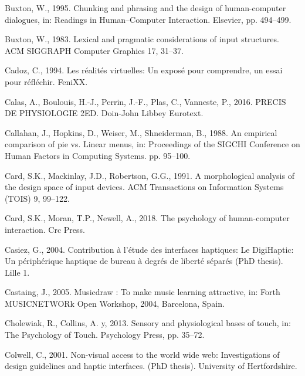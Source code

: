 \documentclass[
]{book}
\newlength{\cslhangindent}
\newlength{\cslentryspacingunit} %
\newenvironment{CSLReferences}[2] %
 {%
  \setlength{\parindent}{0pt}
  \ifodd #1
  \let\oldpar\par
  \def\par{\hangindent=\cslhangindent\oldpar}
  \fi
  \setlength{\parskip}{#2\cslentryspacingunit}
 }%
 {}
\begin{document}
\begin{CSLReferences}{1}{0}
\leavevmode{}%
Buxton, W., 1995. Chunking and phrasing and the design of human-computer dialogues, in: Readings in Human--Computer Interaction. Elsevier, pp. 494--499.

\leavevmode{}%
Buxton, W., 1983. Lexical and pragmatic considerations of input structures. ACM SIGGRAPH Computer Graphics 17, 31--37.

\leavevmode{}%
Cadoz, C., 1994. Les r{é}alit{é}s virtuelles: Un expos{é} pour comprendre, un essai pour r{é}fl{é}chir. FeniXX.

\leavevmode{}%
Calas, A., Boulouis, H.-J., Perrin, J.-F., Plas, C., Vanneste, P., 2016. PRECIS DE PHYSIOLOGIE 2ED. Doin-John Libbey Eurotext.

\leavevmode{}%
Callahan, J., Hopkins, D., Weiser, M., Shneiderman, B., 1988. An empirical comparison of pie vs. Linear menus, in: Proceedings of the SIGCHI Conference on Human Factors in Computing Systems. pp. 95--100.

\leavevmode{}%
Card, S.K., Mackinlay, J.D., Robertson, G.G., 1991. A morphological analysis of the design space of input devices. ACM Transactions on Information Systems (TOIS) 9, 99--122.

\leavevmode{}%
Card, S.K., Moran, T.P., Newell, A., 2018. The psychology of human-computer interaction. Crc Press.

\leavevmode{}%
Casiez, G., 2004. Contribution {à} l'{é}tude des interfaces haptiques: Le DigiHaptic: Un p{é}riph{é}rique haptique de bureau {à} degr{é}s de libert{é} s{é}par{é}s (PhD thesis). Lille 1.

\leavevmode{}%
Castaing, J., 2005. Musicdraw : To make music learning attractive, in: Forth MUSICNETWORk Open Workshop, 2004, Barcelona, Spain.

\leavevmode{}%
Cholewiak, R., Collins, A. y, 2013. Sensory and physiological bases of touch, in: The Psychology of Touch. Psychology Press, pp. 35--72.

\leavevmode{}%
Colwell, C., 2001. Non-visual access to the world wide web: Investigations of design guidelines and haptic interfaces. (PhD thesis). University of Hertfordshire.


\end{CSLReferences}
\end{document}
